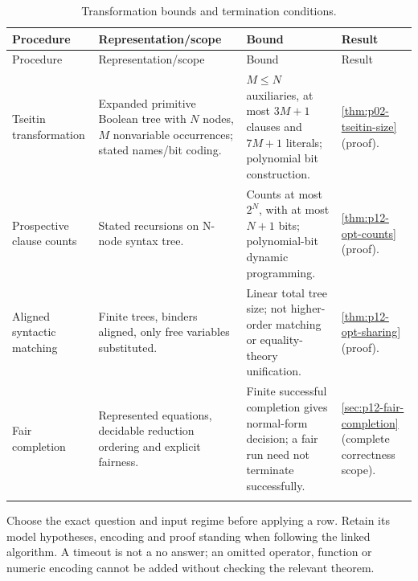\begin{landscape}
\begingroup\small\setlength{\tabcolsep}{3pt}
\begin{longtable}{@{}p{.18\linewidth}p{.25\linewidth}p{.23\linewidth}p{.26\linewidth}@{}}
\caption{Transformation bounds and termination conditions.}\label{tab:p14-dc-preprocessing}\\
\toprule
Procedure & Representation/scope & Bound & Result\\\midrule
\endfirsthead
\toprule
Procedure & Representation/scope & Bound & Result\\\midrule
\endhead
\bottomrule\endfoot
Tseitin transformation & Expanded primitive Boolean tree with \(N\) nodes, \(M\) nonvariable occurrences; stated names/bit coding. & \(M\leq N\) auxiliaries, at most \(3M+1\) clauses and \(7M+1\) literals; polynomial bit construction. & \cref{thm:p02-tseitin-size} (proof).\\\addlinespace
Prospective clause counts & Stated recursions on N-node syntax tree. & Counts at most \(2^N\), with at most \(N+1\) bits; polynomial-bit dynamic programming. & \cref{thm:p12-opt-counts} (proof).\\\addlinespace
Aligned syntactic matching & Finite trees, binders aligned, only free variables substituted. & Linear total tree size; not higher-order matching or equality-theory unification. & \cref{thm:p12-opt-sharing} (proof).\\\addlinespace
Fair completion & Represented equations, decidable reduction ordering and explicit fairness. & Finite successful completion gives normal-form decision; a fair run need not terminate successfully. & \cref{sec:p12-fair-completion} (complete correctness scope).\\\addlinespace
\end{longtable}
\endgroup
\end{landscape}

Choose the exact question and input regime before applying a row. Retain its
model hypotheses, encoding and proof standing when following the linked
algorithm. A timeout is not a no answer; an omitted operator, function or
numeric encoding cannot be added without checking the relevant theorem.
